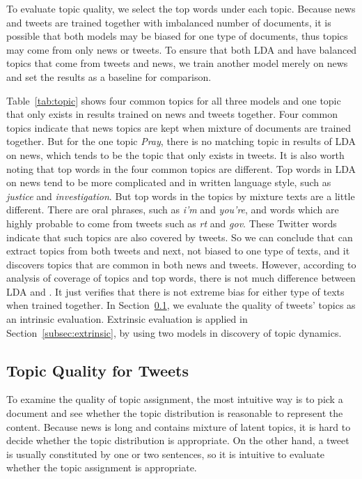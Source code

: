 To evaluate topic quality, we select the top words under each topic. Because news and tweets are trained together with imbalanced number of documents, it is possible that both models may be biased for one type of documents, thus topics may come from only news or tweets. To ensure that both LDA and \stlda have balanced topics that come from tweets and news, we train another model merely on news and set the results as a baseline for comparison.

Table~\ref{tab:topic} shows four common topics for all three models and one topic that only exists in results trained on news and tweets together. Four common topics indicate that news topics are kept when mixture of documents are trained together. But for the one topic \emph{Pray}, there is no matching topic in results of LDA on news, which tends to be the topic that only exists in tweets. It is also worth noting that top words in the four common topics are different. Top words in LDA on news tend to be more complicated and in written language style, such as \emph{justice} and \emph{investigation}. But top words in the topics by mixture texts are a little different. There are oral phrases, such as \emph{i'm} and \emph{you're}, and words which are highly probable to come from tweets such as \emph{rt} and \emph{gov}. These Twitter words indicate that such topics are also covered by tweets. So we can conclude that \stlda can extract topics from both tweets and next, not biased to one type of texts, and it discovers topics that are common in both news and tweets. However, according to analysis of coverage of topics and top words, there is not much difference between LDA and \stlda. It just verifies that there is not extreme bias for either type of texts when trained together. In Section~\ref{subsec:intrinsic}, we evaluate the quality of tweets' topics as an intrinsic evaluation. Extrinsic evaluation is applied in Section~\ref{subsec:extrinsic}, by using two models in discovery of topic dynamics.

\subsection{Topic Quality for Tweets}
\label{subsec:intrinsic}

To examine the quality of topic assignment, the most intuitive way is to pick a document and see whether the topic distribution is reasonable to represent the content. Because news is long and contains mixture of latent topics, it is hard to decide whether the topic distribution is appropriate. On the other hand, a tweet is usually constituted by one or two sentences, so it is intuitive to evaluate whether the topic assignment is appropriate.

